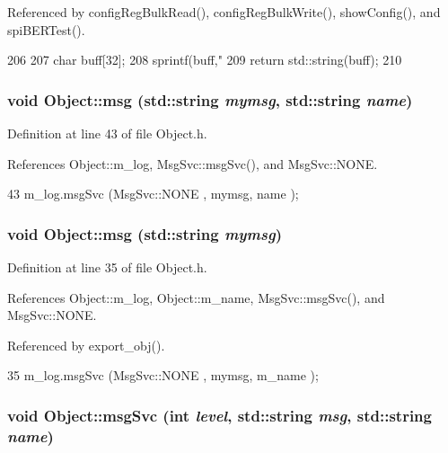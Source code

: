 Referenced by configRegBulkRead(), configRegBulkWrite(), showConfig(), and spiBERTest().


\begin{DoxyCode}
206     {
207         char buff[32];
208         sprintf(buff,"%
209         return std::string(buff);
210     }
\end{DoxyCode}
\hypertarget{classObject_ac5d59299273cee27aacf7de00d2e7034}{
\subsubsection[{msg}]{\setlength{\rightskip}{0pt plus 5cm}void Object::msg (std::string {\em mymsg}, \/  std::string {\em name})}}
\label{classObject_ac5d59299273cee27aacf7de00d2e7034}


Definition at line 43 of file Object.h.

References Object::m\_\-log, MsgSvc::msgSvc(), and MsgSvc::NONE.


\begin{DoxyCode}
43 { m_log.msgSvc (MsgSvc::NONE    , mymsg, name ); }
\end{DoxyCode}
\hypertarget{classObject_a58b2d0618c2d08cf2383012611528d97}{
\subsubsection[{msg}]{\setlength{\rightskip}{0pt plus 5cm}void Object::msg (std::string {\em mymsg})}}
\label{classObject_a58b2d0618c2d08cf2383012611528d97}


Definition at line 35 of file Object.h.

References Object::m\_\-log, Object::m\_\-name, MsgSvc::msgSvc(), and MsgSvc::NONE.

Referenced by export\_\-obj().


\begin{DoxyCode}
35 { m_log.msgSvc (MsgSvc::NONE    , mymsg, m_name ); }
\end{DoxyCode}
\hypertarget{classObject_a3f9d5537ebce0c0f2bf6ae4d92426f3c}{
\subsubsection[{msgSvc}]{\setlength{\rightskip}{0pt plus 5cm}void Object::msgSvc (int {\em level}, \/  std::string {\em msg}, \/  std::string {\em name})}}
\label{classObject_a3f9d5537ebce0c0f2bf6ae4d92426f3c}


